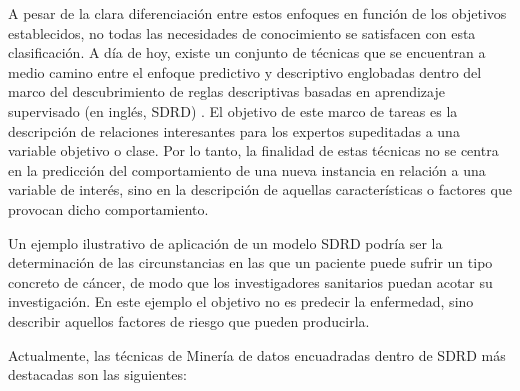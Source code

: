 \documentclass[c5paper,10pt,twoside]{book}	   	%
\begin{document}
A pesar de la clara diferenciación entre estos enfoques en función de los objetivos establecidos, no todas las necesidades de conocimiento se satisfacen con esta clasificación. A día de hoy, existe un conjunto de técnicas que se encuentran a medio camino entre el enfoque predictivo y descriptivo englobadas dentro del marco del descubrimiento de reglas descriptivas basadas en aprendizaje supervisado (en inglés, \ac{SDRD}) \cite{Nlw09}. El objetivo de este marco de tareas es la descripción de relaciones interesantes para los expertos supeditadas a una variable objetivo o clase. Por lo tanto, la finalidad de estas técnicas no se centra en la predicción del comportamiento de una nueva instancia en relación a una variable de interés, sino en la descripción de aquellas características o factores que provocan dicho comportamiento. 

Un ejemplo ilustrativo de aplicación de un modelo \ac{SDRD} podría ser la determinación de las circunstancias en las que un paciente puede sufrir un tipo concreto de cáncer, de modo que los investigadores sanitarios puedan acotar su investigación. En este ejemplo el objetivo no es predecir la enfermedad, sino describir aquellos factores de riesgo que pueden producirla.

Actualmente, las técnicas de Minería de datos encuadradas dentro de \ac{SDRD} más destacadas son las siguientes:
\end{document}
